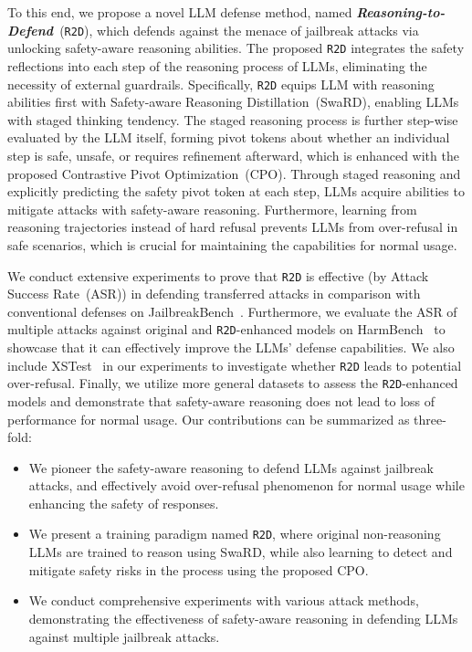 To this end, we propose a novel LLM defense method, named \textbf{\textit{Reasoning-to-Defend}}~(\texttt{R2D}), which defends against the menace of jailbreak attacks via unlocking safety-aware reasoning abilities. The proposed \texttt{R2D} integrates the safety reflections into each step of the reasoning process of LLMs, eliminating the necessity of external guardrails. Specifically, \texttt{R2D} equips LLM with reasoning abilities first with Safety-aware Reasoning Distillation~(SwaRD), enabling LLMs with staged thinking tendency. The staged reasoning process is further step-wise evaluated by the LLM itself, forming pivot tokens about whether an individual step is safe, unsafe, or requires refinement afterward, which is enhanced with the proposed Contrastive Pivot Optimization~(CPO). Through staged reasoning and explicitly predicting the safety pivot token at each step, LLMs acquire abilities to mitigate attacks with safety-aware reasoning. Furthermore, learning from reasoning trajectories instead of hard refusal prevents LLMs from over-refusal in safe scenarios, which is crucial for maintaining the capabilities for normal usage.

We conduct extensive experiments to prove that \texttt{R2D} is effective (by Attack Success Rate~(ASR)) in defending transferred attacks in comparison with conventional defenses on JailbreakBench~\cite{chao2024jailbreakbench}. Furthermore, we evaluate the ASR of multiple attacks against original and \texttt{R2D}-enhanced models on HarmBench~\cite{pmlr-v235-mazeika24a} to showcase that it can effectively improve the LLMs' defense capabilities. We also include XSTest~\cite{rottger-etal-2024-xstest} in our experiments to investigate whether \texttt{R2D} leads to potential over-refusal. Finally, we utilize more general datasets to assess the \texttt{R2D}-enhanced models and demonstrate that safety-aware reasoning does not lead to loss of performance for normal usage. Our contributions can be summarized as three-fold:

\begin{itemize}
    \item 
    We pioneer the safety-aware reasoning to defend LLMs against jailbreak attacks, and effectively avoid over-refusal phenomenon for normal usage while enhancing the safety of responses.
    \item 
    We present a training paradigm named \texttt{R2D}, where original non-reasoning LLMs are trained to reason using SwaRD, while also learning to detect and mitigate safety risks in the process using the proposed CPO.
    \item 
    We conduct comprehensive experiments with various attack methods, demonstrating the effectiveness of safety-aware reasoning in defending LLMs against multiple jailbreak attacks.
\end{itemize}